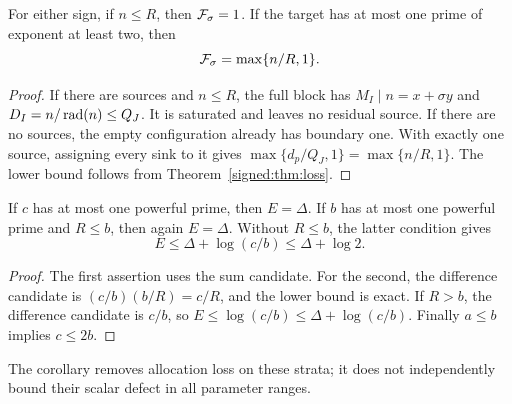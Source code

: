 \begin{proposition}\label{signed:prop:easy}
For either sign, if \(n\le R\), then \(\mathcal F_\sigma=1\). If the target has at most one prime of exponent at least two, then
\[
 \mathcal F_\sigma=\max\{n/R,1\}.
\]
\end{proposition}
\begin{proof}
If there are sources and \(n\le R\), the full block has \(M_I\mid n=x+\sigma y\) and \(D_I=n/\operatorname{rad}(n)\le Q_J\). It is saturated and leaves no residual source. If there are no sources, the empty configuration already has boundary one. With exactly one source, assigning every sink to it gives \(\max\{d_p/Q_J,1\}=\max\{n/R,1\}\). The lower bound follows from Theorem~\ref{signed:thm:loss}.
\end{proof}
\begin{corollary}\label{signed:cor:one}
If \(c\) has at most one powerful prime, then \(E=\Delta\). If \(b\) has at most one powerful prime and \(R\le b\), then again \(E=\Delta\). Without \(R\le b\), the latter condition gives
\[
 E\le\Delta+\log(c/b)\le\Delta+\log2.
\]
\end{corollary}
\begin{proof}
The first assertion uses the sum candidate. For the second, the difference candidate is \((c/b)(b/R)=c/R\), and the lower bound is exact. If \(R>b\), the difference candidate is \(c/b\), so \(E\le\log(c/b)\le\Delta+\log(c/b)\). Finally \(a\le b\) implies \(c\le2b\).
\end{proof}
The corollary removes allocation loss on these strata; it does not independently bound their scalar defect in all parameter ranges.

